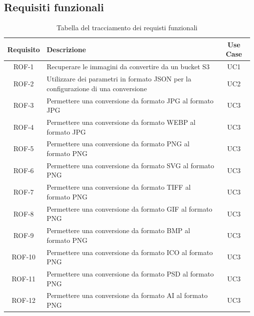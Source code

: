 \subsection{Requisiti funzionali}
\begin{table}[H]
    \caption{Tabella del tracciamento dei requisti funzionali}
    \label{tab:requisiti-funzionali}
    \begin{tabularx}{\textwidth}{|c|X|c|}
        \hline
        \textbf{Requisito} & \textbf{Descrizione}                                            & \textbf{Use Case} \\
        \hline
        ROF-1              & Recuperare le immagini da convertire da un bucket S3
                           & UC1
        \\
        \hline
        ROF-2              & Utilizzare dei parametri in formato JSON per la
        configurazione di una conversione
                           & UC2
        \\
        \hline
        ROF-3              & Permettere una conversione da formato JPG al
        formato JPG        & UC3
        \\
        \hline
        ROF-4              & Permettere una conversione da formato WEBP al formato JPG       & UC3
        \\
        \hline
        ROF-5              & Permettere una conversione da formato PNG al formato PNG        & UC3
        \\
        \hline
        ROF-6              & Permettere una conversione da formato SVG al formato PNG        & UC3
        \\
        \hline
        ROF-7              & Permettere una conversione da formato TIFF al formato PNG       & UC3
        \\
        \hline
        ROF-8              & Permettere una conversione da formato GIF al formato PNG        & UC3
        \\
        \hline
        ROF-9              & Permettere una conversione da formato BMP al formato PNG        & UC3
        \\
        \hline
        ROF-10             & Permettere una conversione da formato ICO al formato PNG        & UC3
        \\
        \hline
        ROF-11             & Permettere una conversione da formato PSD al formato PNG        & UC3
        \\
        \hline
        ROF-12             & Permettere una conversione da formato AI al formato PNG         & UC3

\end{tabularx}
\end{table}
